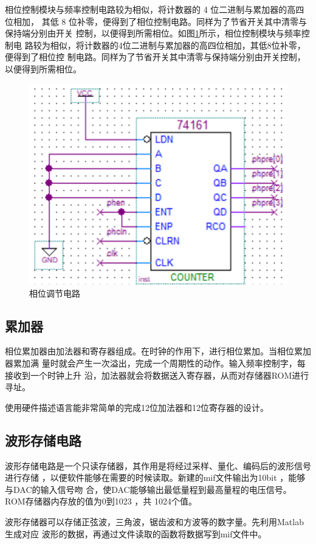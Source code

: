 \documentclass[twoside, openright]{article}
\begin{document}
相位控制模块与频率控制电路较为相似，将计数器的 4 位二进制与累加器的高四位相加，
其低 8 位补零，便得到了相位控制电路。同样为了节省开关其中清零与保持端分别由开关
控制，以便得到所需相位。如图\ref{fig:相位调节电路}所示，相位控制模块与频率控制电
路较为相似，将计数器的4位二进制与累加器的高四位相加，其低8位补零，便得到了相位控
制电路。同样为了节省开关其中清零与保持端分别由开关控制，以便得到所需相位。

\begin{figure}[htbp]
	\centering
	\includegraphics[width = 0.4\linewidth]{ph.png}
	\caption{相位调节电路}
	\label{fig:相位调节电路}
\end{figure}

\subsection{累加器}%
\label{sub:累加器}

相位累加器由加法器和寄存器组成。在时钟的作用下，进行相位累加。当相位累加器累加满
量时就会产生一次溢出，完成一个周期性的动作。输入频率控制字，每接收到一个时钟上升
沿，加法器就会将数据送入寄存器，从而对存储器ROM进行寻址。

使用硬件描述语言能非常简单的完成12位加法器和12位寄存器的设计。



\subsection{波形存储电路}%
\label{sub:波形存储电路}

波形存储电路是一个只读存储器，其作用是将经过采样、量化、编码后的波形信号进行存储
，以便软件能够在需要的时候读取。新建的mif文件输出为10bit ，能够与DAC的输入信号吻
合，使DAC能够输出最低量程到最高量程的电压信号。ROM存储器内存放的值为0到1023 ，共
1024个值。

波形存储器可以存储正弦波，三角波，锯齿波和方波等的数字量。先利用Matlab 生成对应
波形的数据，再通过文件读取的函数将数据写到mif文件中。
\end{document}
